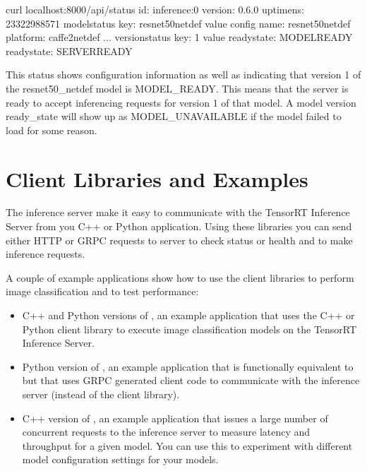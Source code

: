 \documentclass[letterpaper,10pt,english]{sphinxmanual}
\begin{document}
\begin{sphinxVerbatim}[commandchars=\\\{\}]
\PYGZdl{} curl localhost:8000/api/status
id: \PYGZdq{}inference:0\PYGZdq{}
version: \PYGZdq{}0.6.0\PYGZdq{}
uptime\PYGZus{}ns: 23322988571
model\PYGZus{}status \PYGZob{}
  key: \PYGZdq{}resnet50\PYGZus{}netdef\PYGZdq{}
  value \PYGZob{}
    config \PYGZob{}
      name: \PYGZdq{}resnet50\PYGZus{}netdef\PYGZdq{}
      platform: \PYGZdq{}caffe2\PYGZus{}netdef\PYGZdq{}
    \PYGZcb{}
    ...
    version\PYGZus{}status \PYGZob{}
      key: 1
      value \PYGZob{}
        ready\PYGZus{}state: MODEL\PYGZus{}READY
      \PYGZcb{}
    \PYGZcb{}
  \PYGZcb{}
\PYGZcb{}
ready\PYGZus{}state: SERVER\PYGZus{}READY
\end{sphinxVerbatim}

This status shows configuration information as well as indicating that
version 1 of the resnet50\_netdef model is MODEL\_READY. This means that
the server is ready to accept inferencing requests for version 1 of
that model. A model version ready\_state will show up as
MODEL\_UNAVAILABLE if the model failed to load for some reason.


\chapter{Client Libraries and Examples}
\label{\detokenize{client:client-libraries-and-examples}}\label{\detokenize{client:section-client-libraries-and-examples}}\label{\detokenize{client::doc}}
The inference server  make it easy to communicate
with the TensorRT Inference Server from you C++ or Python
application. Using these libraries you can send either HTTP or GRPC
requests to server to check status or health and to make inference
requests.

A couple of example applications show how to use the client libraries
to perform image classification and to test performance:
\begin{itemize}
\item {} 
C++ and Python versions of , an example application
that uses the C++ or Python client library to execute image
classification models on the TensorRT Inference Server.

\item {} 
Python version of , an example application that
is functionally equivalent to  but that uses GRPC
generated client code to communicate with the inference server
(instead of the client library).

\item {} 
C++ version of , an example application that issues a
large number of concurrent requests to the inference server to
measure latency and throughput for a given model. You can use this
to experiment with different model configuration settings for your
models.

\end{itemize}
\end{document}
